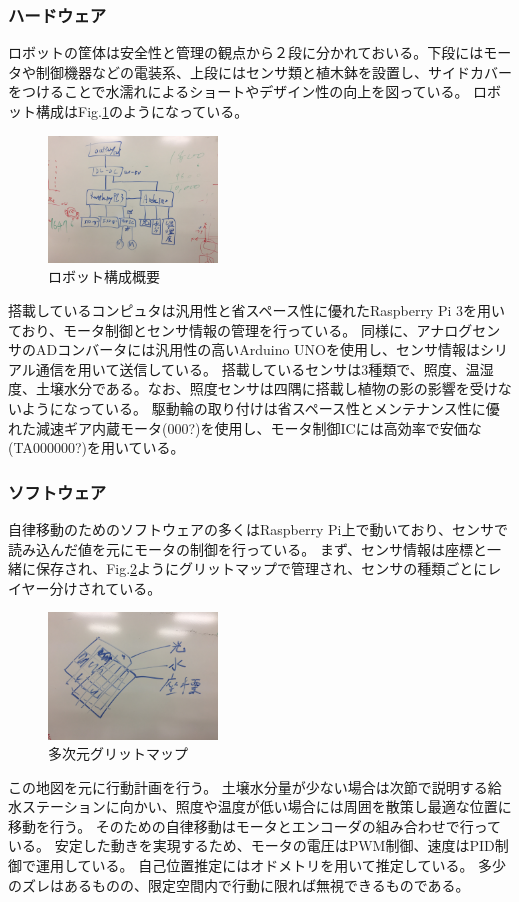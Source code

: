 \documentclass[10pt]{jsarticle}
\begin{document}
\subsubsection{ハードウェア}
ロボットの筐体は安全性と管理の観点から２段に分かれておいる。下段にはモータや制御機器などの電装系、上段にはセンサ類と植木鉢を設置し、サイドカバーをつけることで水濡れによるショートやデザイン性の向上を図っている。
ロボット構成はFig.\ref{robot_hard}のようになっている。
\begin{figure}[ht]
    \centering
    \includegraphics[width=0.4\textwidth]{img/IMG_3893.JPG}
    \caption{ロボット構成概要}
    \label{robot_hard}
\end{figure}
搭載しているコンピュタは汎用性と省スペース性に優れたRaspberry Pi 3を用いており、モータ制御とセンサ情報の管理を行っている。
同様に、アナログセンサのADコンバータには汎用性の高いArduino UNOを使用し、センサ情報はシリアル通信を用いて送信している。
搭載しているセンサは3種類で、照度、温湿度、土壌水分である。なお、照度センサは四隅に搭載し植物の影の影響を受けないようになっている。
駆動輪の取り付けは省スペース性とメンテナンス性に優れた減速ギア内蔵モータ(000?)を使用し、モータ制御ICには高効率で安価な(TA000000?)を用いている。
\subsubsection{ソフトウェア}
自律移動のためのソフトウェアの多くはRaspberry Pi上で動いており、センサで読み込んだ値を元にモータの制御を行っている。
まず、センサ情報は座標と一緒に保存され、Fig.\ref{map}ようにグリットマップで管理され、センサの種類ごとにレイヤー分けされている。
\begin{figure}[ht]
    \centering
    \includegraphics[width=0.4\textwidth]{img/IMG_3895.JPG}
    \caption{多次元グリットマップ}
    \label{map}
\end{figure}
この地図を元に行動計画を行う。
土壌水分量が少ない場合は次節で説明する給水ステーションに向かい、照度や温度が低い場合には周囲を散策し最適な位置に移動を行う。
そのための自律移動はモータとエンコーダの組み合わせで行っている。
安定した動きを実現するため、モータの電圧はPWM制御、速度はPID制御で運用している。
自己位置推定にはオドメトリを用いて推定している。
多少のズレはあるものの、限定空間内で行動に限れば無視できるものである。
\end{document}
